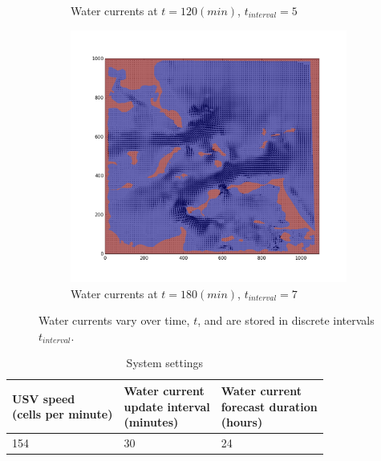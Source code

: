 \documentclass{tamuccthesis}
\begin{document}
\begin{figure}[H]
\begin{subfigure}[b]{0.475\textwidth}
        \caption{{\small Water currents at $t = 120 (min)$, $t_{interval} = 5$}}   
        \label{fig:currents_interval_5}
    \end{subfigure}
    \quad
    \begin{subfigure}[b]{0.475\textwidth}   
        \centering 
        \includegraphics[width=\textwidth,trim={3cm 3cm 3cm 3cm},clip]{Fig_currentsMap-7.png}
        \caption[interval 7]%
        {{\small Water currents at $t = 180 (min)$, $t_{interval} = 7$}}   
        \label{fig:currents_interval_7}
    \end{subfigure}
    \caption[Dynamic water currents.]{Water currents vary over time, $t$, and are stored in discrete intervals $t_{interval}$.} 
    \label{fig:currents_intervals}
\end{figure}

\begin{table}[H]\small
    \centering
    \begin{tabular}{|l|l|l|}
    \hline
    \thead{USV speed \\(cells per minute)} & \thead{Water current \\ update interval \\(minutes)} & \thead{Water current \\ forecast duration \\ (hours)} \\
    \hline
    154                 & 30                                      & 24 \\
    \hline
    \end{tabular}
    \caption{System settings}
    \label{sys_settings}
\end{table}
\end{document}
